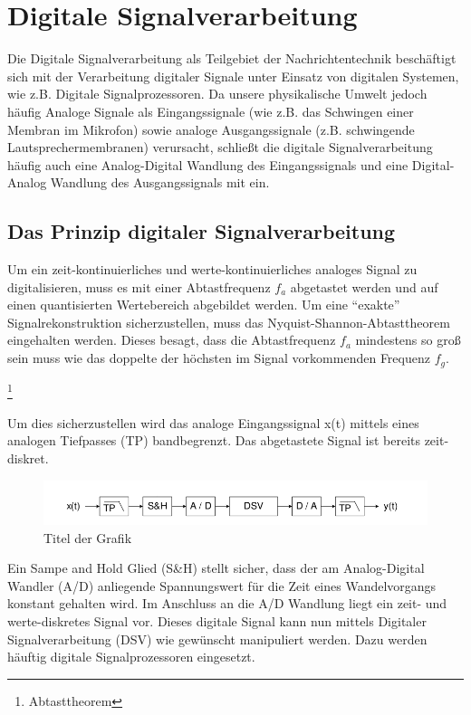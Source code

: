 \documentclass[a4paper,12pt,fontsize=12,DIV=12]{scrartcl}
\begin{document}
\section{Digitale Signalverarbeitung}
Die Digitale Signalverarbeitung als Teilgebiet der Nachrichtentechnik beschäftigt sich mit der Verarbeitung digitaler Signale unter Einsatz von digitalen Systemen, wie z.B. Digitale Signalprozessoren.
Da unsere physikalische Umwelt jedoch häufig Analoge Signale als Eingangssignale (wie z.B. das Schwingen einer Membran im Mikrofon) sowie analoge Ausgangssignale (z.B. schwingende Lautsprechermembranen) verursacht, schließt die digitale Signalverarbeitung häufig auch eine Analog-Digital Wandlung des Eingangssignals und eine Digital-Analog Wandlung des Ausgangssignals mit ein.

\subsection{Das Prinzip digitaler Signalverarbeitung}
Um ein zeit-kontinuierliches und werte-kontinuierliches analoges Signal zu digitalisieren, muss es mit einer Abtastfrequenz $f_a$ abgetastet werden und auf einen quantisierten Wertebereich abgebildet werden. 
Um eine "`exakte"' Signalrekonstruktion sicherzustellen, muss das Nyquist-Shannon-Abtasttheorem eingehalten werden. Dieses besagt, dass die Abtastfrequenz $f_a$ mindestens so groß sein muss wie das doppelte der höchsten im Signal vorkommenden Frequenz $f_g$.
\begin{center}
 \footnote{Abtasttheorem }\\
\end{center}
Um dies sicherzustellen wird das analoge Eingangssignal x(t) mittels eines analogen Tiefpasses (TP) bandbegrenzt. Das abgetastete Signal ist bereits zeit-diskret.
%
\begin{figure}[h]
	\includegraphics[scale=0.5]{Bilder/DSV_Blockschaltbild.png}
	\caption{Titel der Grafik}
	\label{labelname}
\end{figure}
%



Ein Sampe and Hold Glied (S\&H) stellt sicher, dass der am Analog-Digital Wandler (A/D) anliegende Spannungswert für die Zeit eines Wandelvorgangs konstant gehalten wird.
Im Anschluss an die A/D Wandlung liegt ein zeit- und werte-diskretes Signal vor. Dieses digitale Signal kann nun mittels Digitaler Signalverarbeitung (DSV) wie gewünscht manipuliert werden. Dazu werden häuftig digitale Signalprozessoren eingesetzt.
\end{document}
